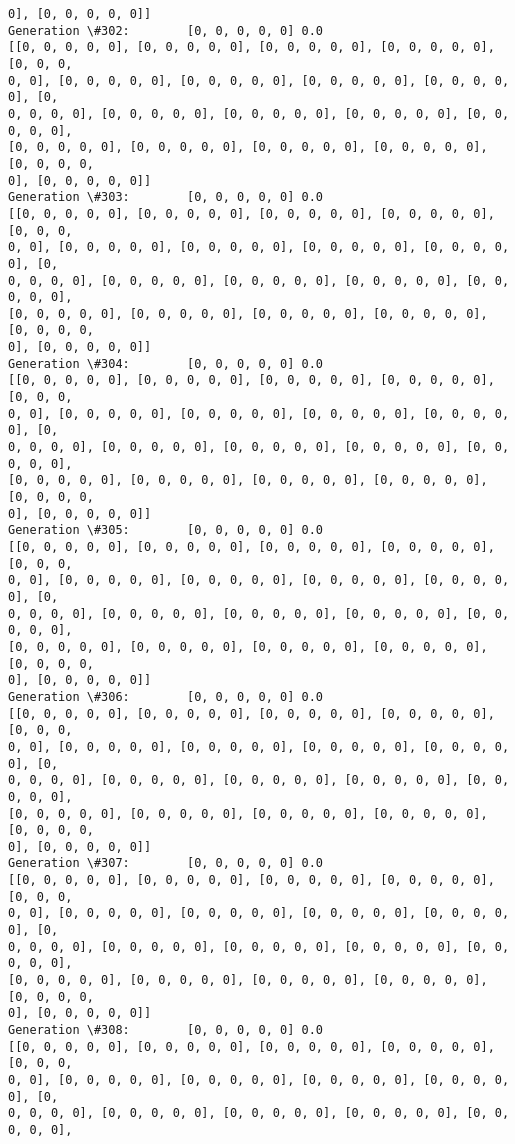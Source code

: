 \documentclass[11pt]{article}
\begin{document}
\begin{Verbatim}[commandchars=\\\{\}]
0], [0, 0, 0, 0, 0]]
Generation \#302:        [0, 0, 0, 0, 0] 0.0
[[0, 0, 0, 0, 0], [0, 0, 0, 0, 0], [0, 0, 0, 0, 0], [0, 0, 0, 0, 0], [0, 0, 0,
0, 0], [0, 0, 0, 0, 0], [0, 0, 0, 0, 0], [0, 0, 0, 0, 0], [0, 0, 0, 0, 0], [0,
0, 0, 0, 0], [0, 0, 0, 0, 0], [0, 0, 0, 0, 0], [0, 0, 0, 0, 0], [0, 0, 0, 0, 0],
[0, 0, 0, 0, 0], [0, 0, 0, 0, 0], [0, 0, 0, 0, 0], [0, 0, 0, 0, 0], [0, 0, 0, 0,
0], [0, 0, 0, 0, 0]]
Generation \#303:        [0, 0, 0, 0, 0] 0.0
[[0, 0, 0, 0, 0], [0, 0, 0, 0, 0], [0, 0, 0, 0, 0], [0, 0, 0, 0, 0], [0, 0, 0,
0, 0], [0, 0, 0, 0, 0], [0, 0, 0, 0, 0], [0, 0, 0, 0, 0], [0, 0, 0, 0, 0], [0,
0, 0, 0, 0], [0, 0, 0, 0, 0], [0, 0, 0, 0, 0], [0, 0, 0, 0, 0], [0, 0, 0, 0, 0],
[0, 0, 0, 0, 0], [0, 0, 0, 0, 0], [0, 0, 0, 0, 0], [0, 0, 0, 0, 0], [0, 0, 0, 0,
0], [0, 0, 0, 0, 0]]
Generation \#304:        [0, 0, 0, 0, 0] 0.0
[[0, 0, 0, 0, 0], [0, 0, 0, 0, 0], [0, 0, 0, 0, 0], [0, 0, 0, 0, 0], [0, 0, 0,
0, 0], [0, 0, 0, 0, 0], [0, 0, 0, 0, 0], [0, 0, 0, 0, 0], [0, 0, 0, 0, 0], [0,
0, 0, 0, 0], [0, 0, 0, 0, 0], [0, 0, 0, 0, 0], [0, 0, 0, 0, 0], [0, 0, 0, 0, 0],
[0, 0, 0, 0, 0], [0, 0, 0, 0, 0], [0, 0, 0, 0, 0], [0, 0, 0, 0, 0], [0, 0, 0, 0,
0], [0, 0, 0, 0, 0]]
Generation \#305:        [0, 0, 0, 0, 0] 0.0
[[0, 0, 0, 0, 0], [0, 0, 0, 0, 0], [0, 0, 0, 0, 0], [0, 0, 0, 0, 0], [0, 0, 0,
0, 0], [0, 0, 0, 0, 0], [0, 0, 0, 0, 0], [0, 0, 0, 0, 0], [0, 0, 0, 0, 0], [0,
0, 0, 0, 0], [0, 0, 0, 0, 0], [0, 0, 0, 0, 0], [0, 0, 0, 0, 0], [0, 0, 0, 0, 0],
[0, 0, 0, 0, 0], [0, 0, 0, 0, 0], [0, 0, 0, 0, 0], [0, 0, 0, 0, 0], [0, 0, 0, 0,
0], [0, 0, 0, 0, 0]]
Generation \#306:        [0, 0, 0, 0, 0] 0.0
[[0, 0, 0, 0, 0], [0, 0, 0, 0, 0], [0, 0, 0, 0, 0], [0, 0, 0, 0, 0], [0, 0, 0,
0, 0], [0, 0, 0, 0, 0], [0, 0, 0, 0, 0], [0, 0, 0, 0, 0], [0, 0, 0, 0, 0], [0,
0, 0, 0, 0], [0, 0, 0, 0, 0], [0, 0, 0, 0, 0], [0, 0, 0, 0, 0], [0, 0, 0, 0, 0],
[0, 0, 0, 0, 0], [0, 0, 0, 0, 0], [0, 0, 0, 0, 0], [0, 0, 0, 0, 0], [0, 0, 0, 0,
0], [0, 0, 0, 0, 0]]
Generation \#307:        [0, 0, 0, 0, 0] 0.0
[[0, 0, 0, 0, 0], [0, 0, 0, 0, 0], [0, 0, 0, 0, 0], [0, 0, 0, 0, 0], [0, 0, 0,
0, 0], [0, 0, 0, 0, 0], [0, 0, 0, 0, 0], [0, 0, 0, 0, 0], [0, 0, 0, 0, 0], [0,
0, 0, 0, 0], [0, 0, 0, 0, 0], [0, 0, 0, 0, 0], [0, 0, 0, 0, 0], [0, 0, 0, 0, 0],
[0, 0, 0, 0, 0], [0, 0, 0, 0, 0], [0, 0, 0, 0, 0], [0, 0, 0, 0, 0], [0, 0, 0, 0,
0], [0, 0, 0, 0, 0]]
Generation \#308:        [0, 0, 0, 0, 0] 0.0
[[0, 0, 0, 0, 0], [0, 0, 0, 0, 0], [0, 0, 0, 0, 0], [0, 0, 0, 0, 0], [0, 0, 0,
0, 0], [0, 0, 0, 0, 0], [0, 0, 0, 0, 0], [0, 0, 0, 0, 0], [0, 0, 0, 0, 0], [0,
0, 0, 0, 0], [0, 0, 0, 0, 0], [0, 0, 0, 0, 0], [0, 0, 0, 0, 0], [0, 0, 0, 0, 0],

\end{Verbatim}
\end{document}

